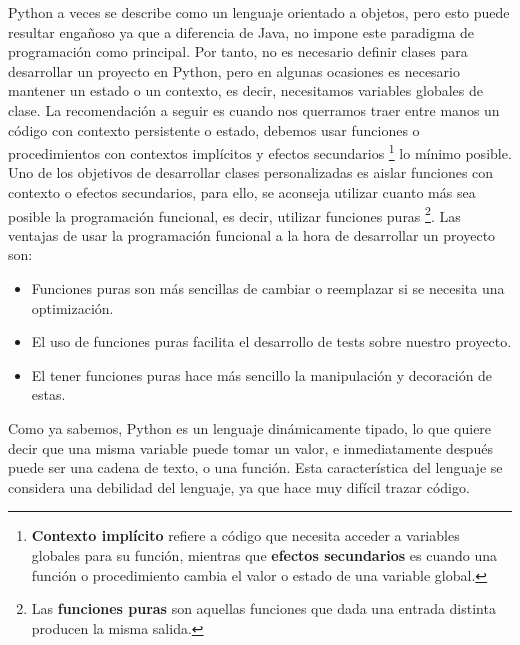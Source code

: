 Python a veces se describe como un lenguaje orientado a objetos, pero esto puede resultar engañoso ya que a diferencia de Java, no impone este paradigma de programación como principal. Por tanto, no es necesario definir clases para desarrollar un proyecto en Python, pero en algunas ocasiones es necesario mantener un estado o un contexto, es decir, necesitamos variables globales de clase. La recomendación a seguir es cuando nos querramos traer entre manos un código con contexto persistente o estado, debemos usar funciones o procedimientos con contextos implícitos y efectos secundarios \footnote{\textbf{Contexto implícito} refiere a código que necesita acceder a variables globales para su función, mientras que \textbf{efectos secundarios} es cuando una función o procedimiento cambia el valor  o estado de una variable global. } lo mínimo posible. Uno de los objetivos de desarrollar clases personalizadas es aislar funciones con contexto o efectos secundarios, para ello, se aconseja utilizar cuanto más sea posible la programación funcional, es decir, utilizar funciones puras \footnote{Las \textbf{funciones puras} son aquellas funciones que dada una entrada distinta producen la misma salida.}. Las ventajas de usar la programación funcional  a la hora de desarrollar un proyecto son:
\begin{itemize}
    \item Funciones puras son más sencillas de cambiar o reemplazar si se necesita una optimización.
    \item El uso de funciones puras facilita el desarrollo de tests sobre nuestro proyecto.
    \item El tener funciones puras hace más sencillo la manipulación y decoración de estas.
\end{itemize}
Como ya sabemos, Python es un lenguaje dinámicamente tipado, lo que quiere decir que una misma variable puede tomar un valor, e inmediatamente después puede ser una cadena de texto, o una función. Esta característica del lenguaje se considera una debilidad del lenguaje, ya que hace muy difícil trazar código.\\

